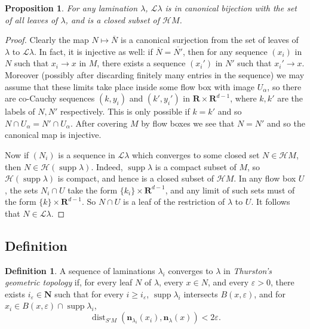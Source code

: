 \documentclass[reqno,10pt]{amsart}
\newcommand{\NN}{\mathbf{N}}
\newcommand{\RR}{\mathbf{R}}
\DeclareMathOperator{\dist}{dist}
\DeclareMathOperator{\supp}{supp}
\newcommand{\Leaves}{\mathscr L}
\newcommand{\Hypspace}{\mathscr H}
\newcommand{\normal}{\mathbf n}
\newcommand{\dfn}[1]{\emph{#1}\index{#1}}
\newtheorem{proposition}[theorem]{Proposition}
\theoremstyle{definition}
\newtheorem{definition}[theorem]{Definition}
\numberwithin{equation}{section}
\begin{document}
\begin{proposition}
For any lamination $\lambda$, $\Leaves \lambda$ is in canonical bijection with the set of all leaves of $\lambda$, and is a closed subset of $\Hypspace M$.
\end{proposition}
\begin{proof}
Clearly the map $N \mapsto \overline N$ is a canonical surjection from the set of leaves of $\lambda$ to $\Leaves \lambda$.
In fact, it is injective as well: if $\overline N = \overline{N'}$, then for any sequence $(x_i)$ in $N$ such that $x_i \to x$ in $M$, there exists a sequence $(x_i')$ in $N'$ such that $x_i' \to x$.
Moreover (possibly after discarding finitely many entries in the sequence) we may assume that these limits take place inside some flow box with image $U_\alpha$, so there are co-Cauchy sequences $(k, y_i)$ and $(k', y_i')$ in $\RR \times \RR^{d - 1}$, where $k, k'$ are the labels of $N, N'$ respectively.
This is only possible if $k = k'$ and so $N \cap U_\alpha = N' \cap U_\alpha$.
After covering $M$ by flow boxes we see that $N = N'$ and so the canonical map is injective.

Now if $(N_i)$ is a sequence in $\Leaves \lambda$ which converges to some closed set $N \in \Hypspace M$, then $N \in \Hypspace(\supp \lambda)$.
Indeed, $\supp \lambda$ is a compact subset of $M$, so $\Hypspace(\supp \lambda)$ is compact, and hence is a closed subset of $\Hypspace M$.
In any flow box $U$, the sets $N_i \cap U$ take the form $\{k_i\} \times \RR^{d - 1}$, and any limit of such sets must of the form $\{k\} \times \RR^{d - 1}$.
So $N \cap U$ is a leaf of the restriction of $\lambda$ to $U$.
It follows that $N \in \Leaves \lambda$.
\end{proof}

\subsection{Definition}

\begin{definition}
A sequence of laminations $\lambda_i$ converges to $\lambda$ in \dfn{Thurston's geometric topology} if, for every leaf $N$ of $\lambda$, every $x \in N$, and every $\varepsilon > 0$, there exists $i_\varepsilon \in \NN$ such that for every $i \geq i_\varepsilon$, $\supp \lambda_i$ intersects $B(x, \varepsilon)$, and for $x_i \in B(x, \varepsilon) \cap \supp \lambda_i$,
\begin{equation}\label{convergence of normals}
\dist_{S' M}(\normal_{\lambda_i}(x_i), \normal_\lambda(x)) < 2\varepsilon.
\end{equation}
\end{definition}
\end{document}
